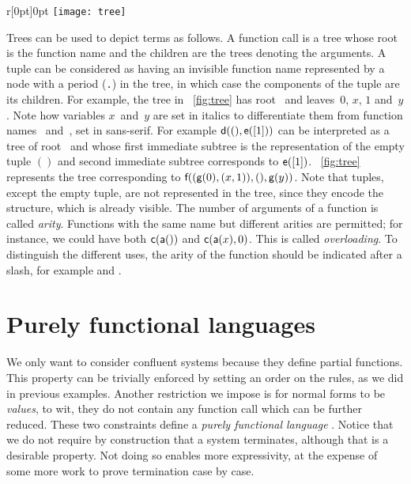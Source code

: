 %
\begin{wrapfigure}[8]{r}[0pt]{0pt}
\centering
\texttt{[image: tree]}%
\caption{\label{fig:tree}}
\end{wrapfigure}
Trees can be used to depict terms as follows. A function call is a
tree whose root is the function name and the children are the trees
denoting the arguments. A tuple can be considered as having an
invisible function name represented by a node with a period
(\texttt{.}) in the tree, in which case the components of the tuple
are its children. For example, the tree in \fig~\vref{fig:tree} has
root~ and leaves~\(0\), \(x\), \(1\) and~\(y\). Note how
variables \(x\)~and~\(y\) are set in italics to differentiate them
from function names ~and~, set in
\textsf{sans\hyp{}serif}. For example \(\textsf{d}((), \textsf{e}([1]))\)
can be interpreted as a tree of root~ and whose first immediate
subtree is the representation of the empty tuple \(()\) and second
immediate subtree corresponds to \(\textsf{e}([1])\). \Fig~\ref{fig:tree}
represents the tree corresponding to
\(\textsf{f}((\textsf{g}(0),(x,1)),(),\textsf{g}(y))\). Note that tuples,
except the empty tuple, are not represented in the tree, since they
encode the structure, which is already visible. The number of
arguments of a function is called \emph{arity}. Functions with the same name but different arities
are permitted; for instance, we could have both \(\textsf{c}(\textsf{a}())\)
and \(\textsf{c}(\textsf{a}(x),0)\). This is called
\emph{overloading}. To
distinguish the different uses, the arity of the function should be
indicated after a slash, for example  and .

\section{Purely functional languages}
\label{sec:functional}

We only want to consider confluent systems because they define partial
functions. This property can be trivially enforced by setting an order
on the rules, as we did in previous examples. Another restriction we
impose is for normal forms to be \emph{values}, to wit, they do not contain any function call which
can be further reduced. These two constraints define a \emph{purely
  functional language}
\citep{Hughes_1989,Hinsen_2009}. Notice
that we do not require by construction that a system terminates,
although that is a desirable property. Not doing so enables more
expressivity, at the expense of some more work to prove termination
case by case.

